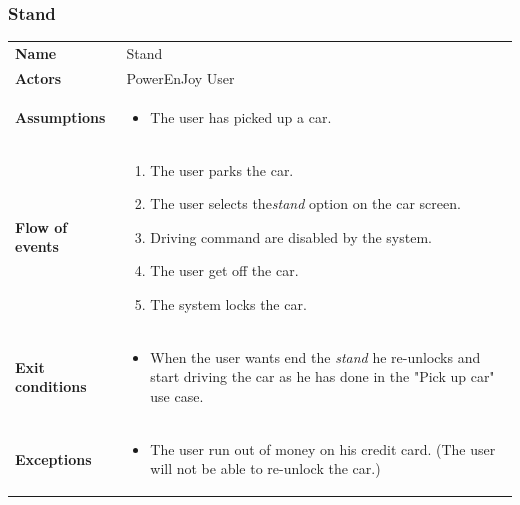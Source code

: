 \documentclass[english]{article}
\newcommand{\stand}{\textit{stand }}
\begin{document}
	\subsubsection{Stand}
	\begin{center}
	\begin{tabular}{l||p{10cm}}
	\textbf{Name} 
		& Stand\\ [8px]
	\textbf{Actors} 
		& PowerEnJoy User\\ [8px]
	\textbf{Assumptions} 
	& \begin{itemize}
		\item The user has picked up a car. 
	\end{itemize}\\
	\textbf{Flow of events}
		& \begin{enumerate}
 		\item The user parks the car.
 		\item The user selects the\stand option on the car screen.
		\item Driving command are disabled by the system. 
		\item The user get off the car.
		\item The system locks the car.
		\end{enumerate}\\ 
	\textbf{Exit conditions}
		&\begin{itemize}
			\item When the user wants end the \stand he re-unlocks and start driving the car as he has done in the "Pick up car" use case.
		\end{itemize}\\
	\textbf{Exceptions}
		& \begin{itemize}
			\item The user run out of money on his credit card. (The user will not be able to re-unlock the car.)
		\end{itemize}
	\end{tabular}
	\end{center}
	
\end{document}
